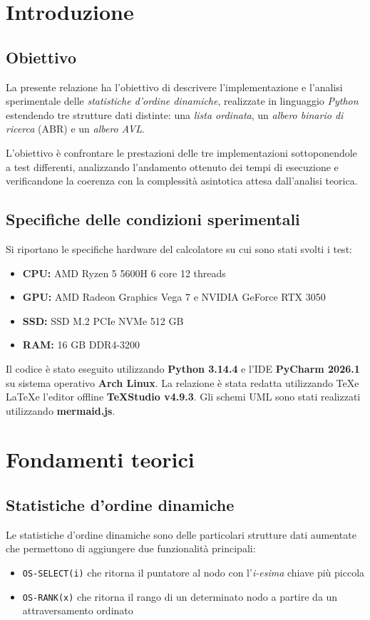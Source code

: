 \section{Introduzione}
\subsection{Obiettivo}
La presente relazione ha l'obiettivo di descrivere l'implementazione e l'analisi sperimentale delle \textit{statistiche d'ordine dinamiche}, realizzate in linguaggio \textit{Python} estendendo tre strutture dati distinte: una \textit{lista ordinata}, un \textit{albero binario di ricerca} (ABR) e un \textit{albero AVL}.

\medskip

L'obiettivo è confrontare le prestazioni delle tre implementazioni sottoponendole a test differenti, analizzando l'andamento ottenuto dei tempi di esecuzione e verificandone la coerenza con la complessità asintotica attesa dall'analisi teorica.

\subsection{Specifiche delle condizioni sperimentali}
Si riportano le specifiche hardware del calcolatore su cui sono stati svolti i test:
\begin{itemize}
	\item \textbf{CPU:} AMD Ryzen 5 5600H 6 core 12 threads
	\item \textbf{GPU:} AMD Radeon Graphics Vega 7 e NVIDIA GeForce RTX 3050
	\item \textbf{SSD:}	SSD M.2 PCIe NVMe 512 GB
	\item \textbf{RAM:} 16 GB DDR4-3200
	
\end{itemize}

Il codice è stato eseguito utilizzando \textbf{Python 3.14.4} e l'IDE \textbf{PyCharm 2026.1} su sistema operativo \textbf{Arch Linux}. La relazione è stata redatta utilizzando \TeX e \LaTeX e l'editor offline \textbf{TeXStudio v4.9.3}. Gli schemi UML sono stati realizzati utilizzando \textbf{mermaid.js}.

\newpage
\section{Fondamenti teorici}
\subsection{Statistiche d'ordine dinamiche}
Le statistiche d'ordine dinamiche sono delle particolari strutture dati aumentate che permettono di aggiungere due funzionalità principali:
\begin{itemize}
	\item \texttt{OS-SELECT(i)} che ritorna il puntatore al nodo con l'\textit{i-esima} chiave più piccola
	\item \texttt{OS-RANK(x)} che ritorna il rango di un determinato nodo a partire da un attraversamento ordinato
\end{itemize}

